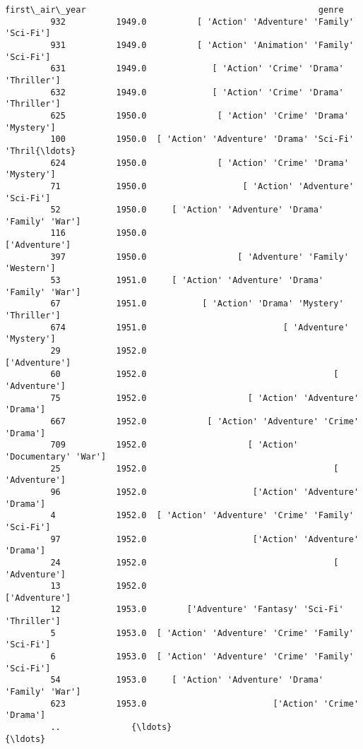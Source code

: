 \documentclass[11pt]{article}
\begin{document}
\begin{Verbatim}[commandchars=\\\{\}]
              first\_air\_year                                              genre  
         932          1949.0          [ 'Action' 'Adventure' 'Family' 'Sci-Fi']  
         931          1949.0          [ 'Action' 'Animation' 'Family' 'Sci-Fi']  
         631          1949.0             [ 'Action' 'Crime' 'Drama' 'Thriller']  
         632          1949.0             [ 'Action' 'Crime' 'Drama' 'Thriller']  
         625          1950.0              [ 'Action' 'Crime' 'Drama' 'Mystery']  
         100          1950.0  [ 'Action' 'Adventure' 'Drama' 'Sci-Fi' 'Thril{\ldots}  
         624          1950.0              [ 'Action' 'Crime' 'Drama' 'Mystery']  
         71           1950.0                   [ 'Action' 'Adventure' 'Sci-Fi']  
         52           1950.0     [ 'Action' 'Adventure' 'Drama' 'Family' 'War']  
         116          1950.0                                      ['Adventure']  
         397          1950.0                  [ 'Adventure' 'Family' 'Western']  
         53           1951.0     [ 'Action' 'Adventure' 'Drama' 'Family' 'War']  
         67           1951.0           [ 'Action' 'Drama' 'Mystery' 'Thriller']  
         674          1951.0                           [ 'Adventure' 'Mystery']  
         29           1952.0                                      ['Adventure']  
         60           1952.0                                     [ 'Adventure']  
         75           1952.0                    [ 'Action' 'Adventure' 'Drama']  
         667          1952.0            [ 'Action' 'Adventure' 'Crime' 'Drama']  
         709          1952.0                    [ 'Action' 'Documentary' 'War']  
         25           1952.0                                     [ 'Adventure']  
         96           1952.0                     ['Action' 'Adventure' 'Drama']  
         4            1952.0  [ 'Action' 'Adventure' 'Crime' 'Family' 'Sci-Fi']  
         97           1952.0                     ['Action' 'Adventure' 'Drama']  
         24           1952.0                                     [ 'Adventure']  
         13           1952.0                                      ['Adventure']  
         12           1953.0        ['Adventure' 'Fantasy' 'Sci-Fi' 'Thriller']  
         5            1953.0  [ 'Action' 'Adventure' 'Crime' 'Family' 'Sci-Fi']  
         6            1953.0  [ 'Action' 'Adventure' 'Crime' 'Family' 'Sci-Fi']  
         54           1953.0     [ 'Action' 'Adventure' 'Drama' 'Family' 'War']  
         623          1953.0                         ['Action' 'Crime' 'Drama']  
         ..              {\ldots}                                                {\ldots}  

\end{Verbatim}
\end{document}
